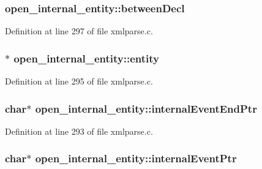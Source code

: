 \subsubsection[{\texorpdfstring{between\+Decl}{betweenDecl}}]{ open\+\_\+internal\+\_\+entity\+::between\+Decl}\hypertarget{structopen__internal__entity_a44e498218b27549536619d532870a5e4}{}\label{structopen__internal__entity_a44e498218b27549536619d532870a5e4}


Definition at line 297 of file xmlparse.\+c.

\subsubsection[{\texorpdfstring{entity}{entity}}]{$\ast$ open\+\_\+internal\+\_\+entity\+::entity}\hypertarget{structopen__internal__entity_a265285cbe3faafa30f00582aba718101}{}\label{structopen__internal__entity_a265285cbe3faafa30f00582aba718101}


Definition at line 295 of file xmlparse.\+c.

\subsubsection[{\texorpdfstring{internal\+Event\+End\+Ptr}{internalEventEndPtr}}]{ char$\ast$ open\+\_\+internal\+\_\+entity\+::internal\+Event\+End\+Ptr}\hypertarget{structopen__internal__entity_a479d92074b2cb942f8988be28e9f88bf}{}\label{structopen__internal__entity_a479d92074b2cb942f8988be28e9f88bf}


Definition at line 293 of file xmlparse.\+c.

\subsubsection[{\texorpdfstring{internal\+Event\+Ptr}{internalEventPtr}}]{ char$\ast$ open\+\_\+internal\+\_\+entity\+::internal\+Event\+Ptr}\hypertarget{structopen__internal__entity_a6deabfb6ca4ee14b08d7e83937135570}{}\label{structopen__internal__entity_a6deabfb6ca4ee14b08d7e83937135570}


